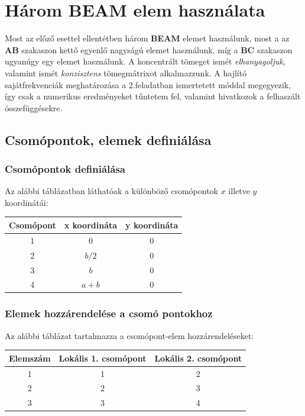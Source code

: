 \documentclass[12pt,a4paper]{article}
\begin{document}
\newpage %

\section{Három BEAM elem használata}
Most az előző esettel ellentétben három \textbf{BEAM} elemet használunk, most a
az \textbf{AB} szakaszon kettő egyenlő nagyságú elemet használunk, míg a \textbf{BC}
szakaszon ugyanúgy egy elemet használunk. A koncentrált tömeget ismét \textit{elhanyagoljuk},
valamint ismét \textit{konzisztens} tömegmátrixot alkalmazzunk. A hajlító sajátfrekvenciák
meghatározása a 2.feladatban ismertetett móddal megegyezik, így csak a numerikus eredményeket
tűntetem fel, valamint hivatkozok a felhaszált összefüggésekre.
\subsection{Csomópontok, elemek definiálása}
\subsubsection{Csomópontok definiálása}
Az alábbi táblázatban láthatóak a különböző csomópontok $x$ illetve
$y$ koordinátái:
\begin{center}
    \begin{tabular}{|c|c|c|}
        \hline
        Csomópont & x koordináta & y koordináta \\
        \hline
        \hline
        1         & 0            & $0$          \\
        \hline
        2         & $b/2$        & $0$          \\
        \hline
        3         & $b$          & $0$          \\
        \hline
        4         & $a+b$        & $0$          \\
        \hline
    \end{tabular}
\end{center}

\subsubsection{Elemek hozzárendelése a csomó pontokhoz}
Az alábbi táblázat tartalmazza a csomópont-elem hozzárendeléseket:
\begin{center}
    \begin{tabular}{|c|c|c|}
        \hline
        Elemszám & Lokális 1. csomópont & Lokális 2. csomópont \\
        \hline
        \hline
        1        & 1                    & 2                    \\
        \hline
        2        & 2                    & 3                    \\
        \hline
        3        & 3                    & 4                    \\
        \hline
    \end{tabular}
\end{center}
\end{document}
